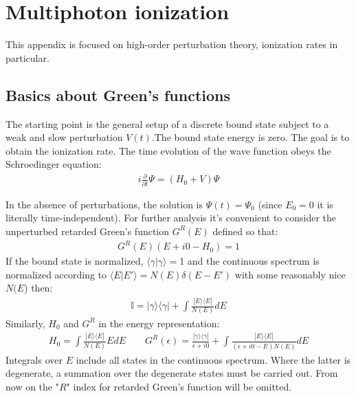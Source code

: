 \chapter{Multiphoton ionization} 

This appendix is focused on high-order perturbation theory, ionization rates in particular. 

\section{Basics about Green's functions}

The starting point is the general setup of a discrete bound state subject to a weak and slow perturbation $ V(t) $.The bound state energy is zero. The goal is to obtain the ionization rate. The time evolution of the wave function obeys the Schroedinger equation:
\begin{gather}
\label{shr_eq_general}
	i\frac{\partial}{\partial t}\Psi=(H_{0}+V)\Psi
\end{gather}

In the absence of perturbations, the solution is $ \Psi(t)=\Psi_{0} $ (since $ E_{0}=0 $ it is literally time-independent). For further analysis it's convenient to consider the unperturbed retarded Green's function $ G^{R}(E) $ defined so that:
\begin{gather}
\label{green_function_def}
	G^{R}(E)(E+i0-H_{0})=1
\end{gather}
If the bound state is normalized, $ \langle\gamma|\gamma\rangle= $1 and the continuous spectrum is normalized according to $ \langle E|E'\rangle=N(E)\delta(E-E') $ with some reasonably nice $ N(E $) then:
\begin{gather}
\mathbb{I}=|\gamma\rangle\langle\gamma|+\int\frac{|E\rangle\langle E|}{N(E)}dE
\end{gather}
Similarly, $ H_{0} $ and $ G^{R} $ in the energy representation:
\begin{gather}
	H_{0}=\int\frac{|E\rangle\langle E|}{N(E)}EdE
	\qquad
	G^{R}(\epsilon)=\frac{|\gamma\rangle\langle\gamma|}{\epsilon+i0}+\int\frac{|E\rangle\langle E|}{(\epsilon+i0-E)N(E)}dE
\end{gather}
Integrals over $ E $ include all states in the continuous spectrum. Where the latter is degenerate, a summation over the degenerate states must be carried out. From now on the "$ R $" index for retarded Green's function will be omitted.

